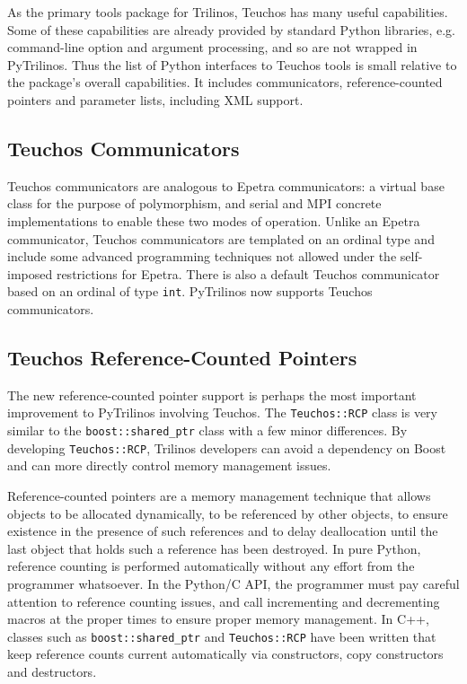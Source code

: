 \documentclass[11pt]{article}
\begin{document}
As the primary tools package for Trilinos, Teuchos has many useful capabilities.  Some of these capabilities are already provided by standard Python libraries, e.g. command-line option and argument processing, and so are not wrapped in PyTrilinos.  Thus the list of Python interfaces to Teuchos tools is small relative to the package's overall capabilities.  It includes communicators, reference-counted pointers and parameter lists, including XML support.

\subsection{Teuchos Communicators}
\label{sec:teuchos_communicators}

Teuchos communicators are analogous to Epetra communicators: a virtual base class for the purpose of polymorphism, and serial and MPI concrete implementations to enable these two modes of operation.  Unlike an Epetra communicator, Teuchos communicators are templated on an ordinal type and include some advanced programming techniques not allowed under the self-imposed restrictions for Epetra.  There is also a default Teuchos communicator based on an ordinal of type {\tt int}.  PyTrilinos now supports Teuchos communicators.

\subsection{Teuchos Reference-Counted Pointers}
\label{sec:teuchos_rcp}

The new reference-counted pointer support is perhaps the most important improvement to PyTrilinos involving Teuchos.  The {\tt Teuchos::RCP} class is very similar to the {\tt boost::shared\_ptr} class with a few minor differences.  By developing {\tt Teuchos::RCP}, Trilinos developers can avoid a dependency on Boost and can more directly control memory management issues.

Reference-counted pointers are a memory management technique that allows objects to be allocated dynamically, to be referenced by other objects, to ensure existence in the presence of such references and to delay deallocation until the last object that holds such a reference has been destroyed.  In pure Python, reference counting is performed automatically without any effort from the programmer whatsoever.  In the Python/C API, the programmer must pay careful attention to reference counting issues, and call incrementing and decrementing macros at the proper times to ensure proper memory management.  In C++, classes such as {\tt boost::shared\_ptr} and {\tt Teuchos::RCP} have been written that keep reference counts current automatically via constructors, copy constructors and destructors.
\end{document}
